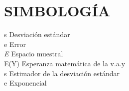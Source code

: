 \documentclass[12pt, a4paper, nofontenc, numbers=endperiod]{apa7}
\begin{document}
{\begin{flushleft}
			\end{flushleft}
			
			\section*{\large \centering SIMBOLOGÍA}
			\begin{flushleft}	
				\hspace*{3cm}s	\hspace{2cm} Desviación estándar\\ 
				\hspace*{3cm}e	\hspace{2cm} Error\\  
				\hspace*{3cm}\textit{E} \hspace{1.9cm} Espacio muestral\\  
				\hspace*{2.9cm} E(Y) \hspace{1.3cm} Esperanza matemática de la v.a.y\\  
				\hspace*{3cm} s 	\hspace{2.05cm} Estimador de la desviación estándar\\  
				\hspace*{3.1cm}e	\hspace{2.1cm} Exponencial\\ 
			\end{flushleft}
		}
		\newpage
\end{document}
